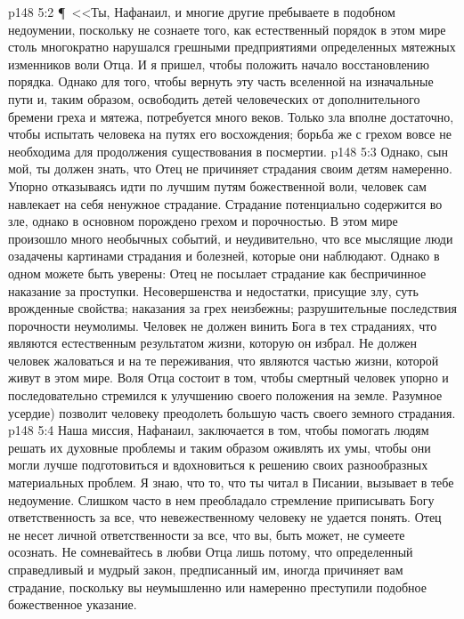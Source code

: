 \vs p148 5:2 \P\ <<Ты, Нафанаил, и многие другие пребываете в подобном недоумении, поскольку не сознаете того, как естественный порядок в этом мире столь многократно нарушался грешными предприятиями определенных мятежных изменников воли Отца. И я пришел, чтобы положить начало восстановлению порядка. Однако для того, чтобы вернуть эту часть вселенной на изначальные пути и, таким образом, освободить детей человеческих от дополнительного бремени греха и мятежа, потребуется много веков. Только зла вполне достаточно, чтобы испытать человека на путях его восхождения; борьба же с грехом вовсе не необходима для продолжения существования в посмертии.
\vs p148 5:3 Однако, сын мой, ты должен знать, что Отец не причиняет страдания своим детям намеренно. Упорно отказываясь идти по лучшим путям божественной воли, человек сам навлекает на себя ненужное страдание. Страдание потенциально содержится во зле, однако в основном порождено грехом и порочностью. В этом мире произошло много необычных событий, и неудивительно, что все мыслящие люди озадачены картинами страдания и болезней, которые они наблюдают. Однако в одном можете быть уверены: Отец не посылает страдание как беспричинное наказание за проступки. Несовершенства и недостатки, присущие злу, суть врожденные свойства; наказания за грех неизбежны; разрушительные последствия порочности неумолимы. Человек не должен винить Бога в тех страданиях, что являются естественным результатом жизни, которую он избрал. Не должен человек жаловаться и на те переживания, что являются частью жизни, которой живут в этом мире. Воля Отца состоит в том, чтобы смертный человек упорно и последовательно стремился к улучшению своего положения на земле. Разумное усердие) позволит человеку преодолеть большую часть своего земного страдания.
\vs p148 5:4 Наша миссия, Нафанаил, заключается в том, чтобы помогать людям решать их духовные проблемы и таким образом оживлять их умы, чтобы они могли лучше подготовиться и вдохновиться к решению своих разнообразных материальных проблем. Я знаю, что то, что ты читал в Писании, вызывает в тебе недоумение. Слишком часто в нем преобладало стремление приписывать Богу ответственность за все, что невежественному человеку не удается понять. Отец не несет личной ответственности за все, что вы, быть может, не сумеете осознать. Не сомневайтесь в любви Отца лишь потому, что определенный справедливый и мудрый закон, предписанный им, иногда причиняет вам страдание, поскольку вы неумышленно или намеренно преступили подобное божественное указание.
